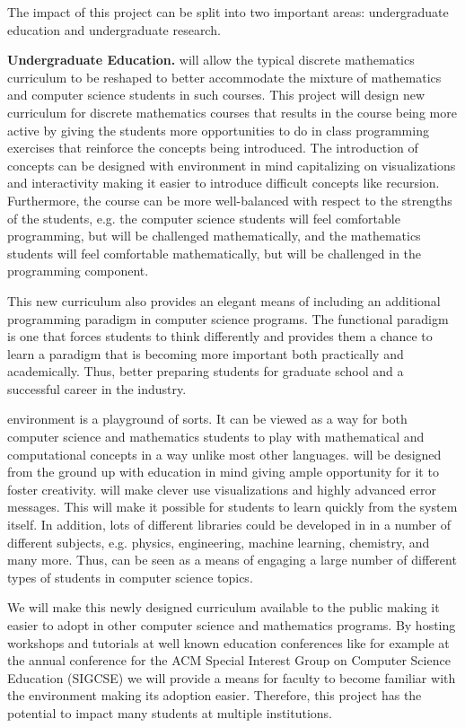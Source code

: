 The impact of this project can be split into two important areas:
undergraduate education and undergraduate research.

\textbf{Undergraduate Education.}  \thelang{} will allow the typical
discrete mathematics curriculum to be reshaped to better accommodate
the mixture of mathematics and computer science students in such
courses.  This project will design new curriculum for discrete
mathematics courses that results in the course being more active by
giving the students more opportunities to do in class programming
exercises that reinforce the concepts being introduced.  The
introduction of concepts can be designed with \thelang{} environment
in mind capitalizing on visualizations and interactivity making it
easier to introduce difficult concepts like recursion.  Furthermore,
the course can be more well-balanced with respect to the strengths of
the students, e.g. the computer science students will feel comfortable
programming, but will be challenged mathematically, and the
mathematics students will feel comfortable mathematically, but will be
challenged in the programming component.

This new curriculum also provides an elegant means of including an
additional programming paradigm in computer science programs.  The
functional paradigm is one that forces students to think differently
and provides them a chance to learn a paradigm that is becoming more
important both practically and academically.  Thus, better preparing
students for graduate school and a successful career in the industry.

\thelang{} environment is a playground of sorts.  It can be viewed as
a way for both computer science and mathematics students to play with
mathematical and computational concepts in a way unlike most other
languages.  \thelang{} will be designed from the ground up with
education in mind giving ample opportunity for it to foster
creativity.  \thelang{} will make clever use visualizations and highly
advanced error messages.  This will make it possible for students to
learn quickly from the system itself.  In addition, lots of different
libraries could be developed in \thelang{} in a number of different
subjects, e.g. physics, engineering, machine learning, chemistry, and
many more.  Thus, \thelang{} can be seen as a means of engaging a
large number of different types of students in computer science
topics.

We will make this newly designed curriculum available to the public
making it easier to adopt in other computer science and mathematics
programs.  By hosting workshops and tutorials at well known education
conferences like for example at the annual conference for the ACM
Special Interest Group on Computer Science Education (SIGCSE) we will
provide a means for faculty to become familiar with the \thelang{}
environment making its adoption easier.  Therefore, this project has
the potential to impact many students at multiple institutions.

